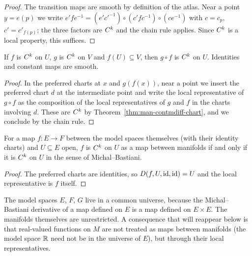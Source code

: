 \begin{proof}
  \leanok
  The transition maps are smooth by definition of the atlas. Near a point $y = e(p)$ we write
  $e' f e^{-1} = (e' c'^{-1}) \circ (c' f c^{-1}) \circ (c e^{-1})$ with $c = c_p$,
  $c' = c'_{f(p)}$; the three factors are $C^{k}$ and the chain rule applies. Since $C^{k}$ is a
  local property, this suffices.
\end{proof}

\begin{theorem}[Composition]
  \label{thm:man-comp}
  \leanok
  If $f$ is $C^{k}$ on $U$, $g$ is $C^{k}$ on $V$ and $f(U) \subseteq V$, then $g \circ f$ is
  $C^{k}$ on $U$. Identities and constant maps are smooth.
\end{theorem}

\begin{proof}
  \leanok
  In the preferred charts at $x$ and $g(f(x))$, near a point we insert the preferred chart $d$ at
  the intermediate point and write the local representative of $g \circ f$ as the composition of
  the local representatives of $g$ and $f$ in the charts involving $d$. These are $C^{k}$ by
  Theorem~\ref{thm:man-contmdiff-chart}, and we conclude by the chain rule.
\end{proof}

\begin{proposition}
  \label{prop:man-consistency}
  \leanok
  For a map $f \colon E \to F$ between the model spaces themselves (with their identity charts)
  and $U \subseteq E$ open, $f$ is $C^{k}$ on $U$ as a map between manifolds if and only if it
  is $C^{k}$ on $U$ in the sense of Michal--Bastiani.
\end{proposition}

\begin{proof}
  \leanok
  The preferred charts are identities, so $D(f, U, \mathrm{id}, \mathrm{id}) = U$ and the local representative
  is $f$ itself.
\end{proof}

\begin{remark}[Universes]
  \label{rem:man-universes}
  The model spaces $E$, $F$, $G$ live in a common universe, because the Michal--Bastiani
  derivative of a map defined on $E$ is a map defined on $E \times E$. The manifolds themselves
  are unrestricted. A consequence that will reappear below is that real-valued functions on
  $M$ are not treated as maps between manifolds (the model space $\mathbb{R}$ need not be in the
  universe of $E$), but through their local representatives.
\end{remark}


